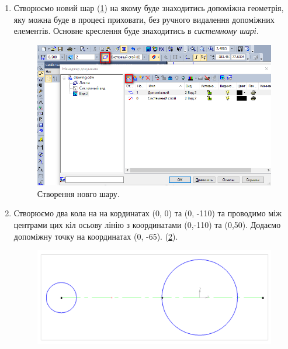 \begin{enumerate}[leftmargin=*]
\item Створюємо новий шар (\ref{fig:lab4:new_layer}) на якому буде знаходитись допоміжна геометрія,
  яку можна буде в процесі приховати, без ручного видалення допоміжних елементів. Основне креслення
  буде знаходитись в \textit{системному шарі}.

  \newpage\restoregeometry\BorderText
  \begin{figure}[!ht]
    \centering \includegraphics[width=0.9\linewidth]{./images/lab4/create_new_layer.png}
    \caption{Створення новго шару.}
    \label{fig:lab4:new_layer}
  \end{figure}
  \FloatBarrier

\item Створюємо два кола на на кординатах (0, 0) та (0, -110) та проводимо між центрами цих кіл
  осьову лінію з координатами (0,-110) та (0,50). Додаємо допоміжну точку на координатах (0,
  -65). (\ref{fig:lab4:step1}).
  \begin{figure}[!ht]
    \centering \includegraphics[width=0.9\linewidth]{./images/lab4/step1.png}
    \caption{\label{fig:lab4:step1}}
  \end{figure}
  \FloatBarrier


\end{enumerate}
